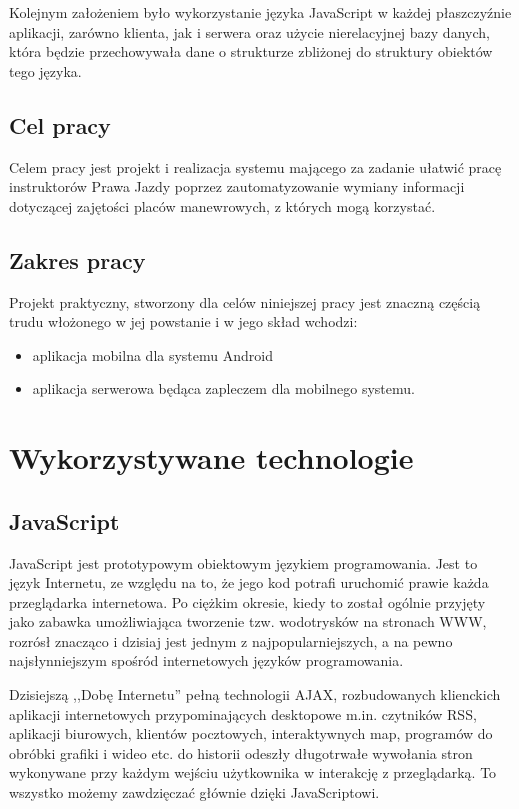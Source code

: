 \documentclass[twoside,a4paper,openright,12pt]{book}
\begin{document}
Kolejnym założeniem było wykorzystanie języka JavaScript w każdej płaszczyźnie aplikacji, zarówno klienta, jak i serwera oraz użycie nierelacyjnej bazy danych, która będzie przechowywała dane o strukturze zbliżonej do struktury obiektów tego języka.


\section{Cel pracy}

Celem pracy jest projekt i realizacja systemu mającego za zadanie ułatwić pracę instruktorów Prawa Jazdy poprzez zautomatyzowanie wymiany informacji dotyczącej zajętości placów manewrowych, z których mogą korzystać.


\section{Zakres pracy}

Projekt praktyczny, stworzony dla celów niniejszej pracy jest znaczną częścią trudu włożonego w jej powstanie i w jego skład wchodzi:

\begin{itemize}
	\item aplikacja mobilna dla systemu Android
	\item aplikacja serwerowa będąca zapleczem dla mobilnego systemu.
\end{itemize}




\chapter{Wykorzystywane technologie}

\section{JavaScript}

JavaScript jest prototypowym obiektowym językiem programowania. Jest to język Internetu, ze względu na to, że jego kod potrafi uruchomić prawie każda przeglądarka internetowa. Po ciężkim okresie, kiedy to został ogólnie przyjęty jako zabawka umożliwiająca tworzenie tzw. wodotrysków na stronach WWW, rozrósł znacząco i dzisiaj jest jednym z najpopularniejszych, a na pewno najsłynniejszym spośród internetowych języków programowania.

Dzisiejszą ,,Dobę Internetu'' pełną technologii AJAX, rozbudowanych klienckich aplikacji internetowych przypominających desktopowe m.in. czytników RSS, aplikacji biurowych, klientów pocztowych, interaktywnych map, programów do obróbki grafiki i wideo etc. do historii odeszły długotrwałe wywołania stron wykonywane przy każdym wejściu użytkownika  w interakcję z przeglądarką. \cite{stefanov2012javascript}\cite{stefanov2010javascript}\cite{maccaw2012javascript} To wszystko możemy zawdzięczać głównie dzięki JavaScriptowi.
\end{document}
